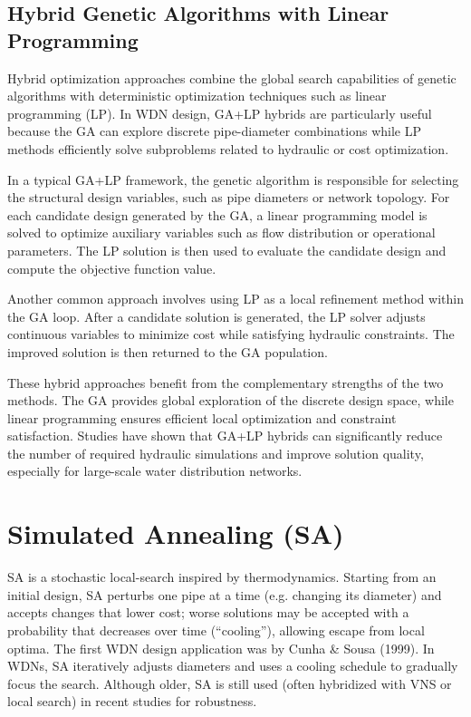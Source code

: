 \documentclass[12pt, a4paper]{article}
\begin{document}
\subsection*{Hybrid Genetic Algorithms with Linear Programming}

Hybrid optimization approaches combine the global search capabilities of genetic algorithms with deterministic optimization techniques such as linear programming (LP). In WDN design, GA+LP hybrids are particularly useful because the GA can explore discrete pipe-diameter combinations while LP methods efficiently solve subproblems related to hydraulic or cost optimization.

In a typical GA+LP framework, the genetic algorithm is responsible for selecting the structural design variables, such as pipe diameters or network topology. For each candidate design generated by the GA, a linear programming model is solved to optimize auxiliary variables such as flow distribution or operational parameters. The LP solution is then used to evaluate the candidate design and compute the objective function value.

Another common approach involves using LP as a local refinement method within the GA loop. After a candidate solution is generated, the LP solver adjusts continuous variables to minimize cost while satisfying hydraulic constraints. The improved solution is then returned to the GA population.

These hybrid approaches benefit from the complementary strengths of the two methods. The GA provides global exploration of the discrete design space, while linear programming ensures efficient local optimization and constraint satisfaction. Studies have shown that GA+LP hybrids can significantly reduce the number of required hydraulic simulations and improve solution quality, especially for large-scale water distribution networks.

\section*{Simulated Annealing (SA)}
SA is a stochastic local-search inspired by thermodynamics. Starting from an initial design, SA perturbs one pipe at a time (e.g. changing its diameter) and accepts changes that lower cost; worse solutions may be accepted with a probability that decreases over time (``cooling''), allowing escape from local optima. The first WDN design application was by Cunha \& Sousa (1999)\cite{ref4}. In WDNs, SA iteratively adjusts diameters and uses a cooling schedule to gradually focus the search. Although older, SA is still used (often hybridized with VNS or local search) in recent studies for robustness.
\end{document}
